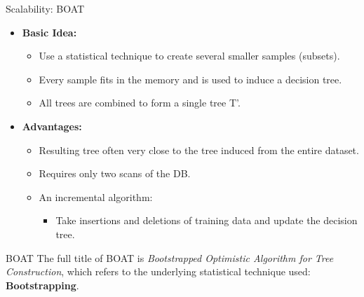 \begin{frame}{Scalability: BOAT}
	\begin{itemize}
		\item \textbf{Basic Idea:}
		      \begin{itemize}
			      \item Use a statistical technique to create several smaller samples (subsets).
			      \item Every sample fits in the memory and is used to induce a decision tree.
			      \item All trees are combined to form a single tree T'.
		      \end{itemize}
		\item \textbf{Advantages:}
		      \begin{itemize}
			      \item Resulting tree often very close to the tree induced from the entire dataset.
			      \item Requires only two scans of the DB.
			      \item An incremental algorithm:
			            \begin{itemize}
				            \item Take insertions and deletions of training data and update the decision tree.
			            \end{itemize}
		      \end{itemize}
	\end{itemize}

	\vspace*{0.5cm}

	\begin{block}{BOAT}
		The full title of BOAT is \textit{Bootstrapped Optimistic Algorithm for Tree Construction}, which refers to the underlying statistical technique used: \textbf{Bootstrapping}.
	\end{block}
\end{frame}
